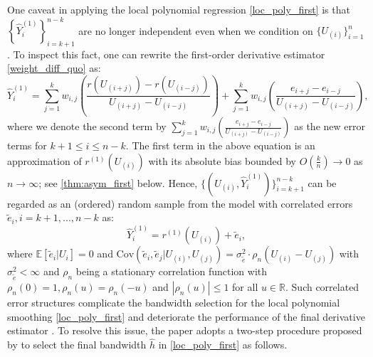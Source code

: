 \documentclass{uwstat572}
\theoremstyle{definition}
\renewcommand{\hat}{\widehat}
\renewcommand{\tilde}{\widetilde}
\theoremstyle{theorem}
\begin{document}
One caveat in applying the local polynomial regression \eqref{loc_poly_first} is that $\left\{\hat{Y}_i^{(1)}\right\}_{i=k+1}^{n-k}$ are no longer independent even when we condition on $\{U_{(i)}\}_{i=1}^n$. To inspect this fact, one can rewrite the first-order derivative estimator \eqref{weight_diff_quo} as:
$$\hat{Y}_i^{(1)} = \sum_{j=1}^k w_{i,j} \left(\frac{r(U_{(i+j)}) - r(U_{(i-j)})}{U_{(i+j)} - U_{(i-j)}}\right) + \sum_{j=1}^k w_{i,j} \left(\frac{e_{i+j} - e_{i-j}}{U_{(i+j)} - U_{(i-j)}}\right),$$
where we denote the second term by $\sum_{j=1}^k w_{i,j} \left(\frac{e_{i+j} - e_{i-j}}{U_{(i+j)} - U_{(i-j)}}\right)$ as the new error terms for $k+1\leq i \leq n-k$. The first term in the above equation is an approximation of $r^{(1)}(U_{(i)})$ with its absolute bias bounded by $O\left(\frac{k}{n}\right) \to 0$ as $n\to \infty$; see \autoref{thm:asym_first} below. Hence, $\{(U_{(i)}, \hat{Y}_i^{(1)})\}_{i=k+1}^{n-k}$ can be regarded as an (ordered) random sample from the model with correlated errors $\tilde{e}_i,i=k+1,...,n-k$ as:
\begin{equation}
\label{rand_design_first_cor}
\hat{Y}_i^{(1)} = r^{(1)}(U_{(i)}) + \tilde{e}_i,
\end{equation}
where $\mathbb{E}\left[\tilde{e}_i|U_i\right]=0$ and $\mathrm{Cov}\left(\tilde{e}_i,\tilde{e}_j | U_{(i)},U_{(j)} \right) = \sigma_{\tilde{e}}^2 \cdot \rho_n(U_{(i)}-U_{(j)})$ with $\sigma_{\tilde{e}}^2 <\infty$ and $\rho_n$ being a stationary correlation function with $\rho_n(0)=1, \rho_n(u) = \rho_n(-u)$ and $|\rho_n(u)|\leq 1$ for all $u\in \mathbb{R}$. Such correlated error structures complicate the bandwidth selection for the local polynomial smoothing \eqref{loc_poly_first} and deteriorate the performance of the final derivative estimator \citep{opsomer2001nonparametric,de2018local}. To resolve this issue, the paper adopts a two-step procedure proposed by \cite{de2018local} to select the final bandwidth $\hat{h}$ in \eqref{loc_poly_first} as follows.
\end{document}
